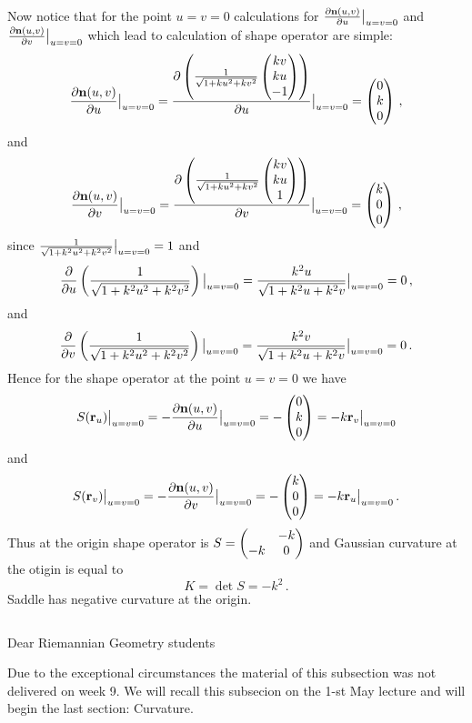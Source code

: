 \documentclass[12pt]{article}
\theoremstyle{theorem}
\numberwithin{equation}{section}
\begin{document}
{ 
Now notice that for the point $u=v=0$
calculations for 
${\partial{\bf n}(u,v)\over \partial u}\big\vert_{u=v=0}$ and
${\partial{\bf n}(u,v)\over \partial v}\big\vert_{u=v=0}$ which lead to
calculation of shape operator are
simple:
      $$
{\partial{\bf n}(u,v)\over \partial u}\big\vert_{u=v=0}=
{\partial  \left(  
   {1\over \sqrt {1+ku^2+kv^2}}
       \begin{pmatrix}
     kv\cr ku\cr -1\cr
    \end{pmatrix}
         \right)
     \over \partial u}\big\vert_{u=v=0}= 
      \begin{pmatrix}
      0\cr k\cr 0\cr
       \end{pmatrix}\,,
         $$
and   $$
{\partial{\bf n}(u,v)\over \partial v}\big\vert_{u=v=0}=
{\partial  \left(  
   {1\over \sqrt {1+ku^2+kv^2}}
       \begin{pmatrix}
     kv\cr ku\cr 1\cr
    \end{pmatrix}
         \right)
     \over \partial v}\big\vert_{u=v=0}= 
      \begin{pmatrix}
       k\cr 0\cr 0\cr
       \end{pmatrix}\,,
         $$
since
     ${1\over \sqrt {1+k^2u^2+k^2v^2}}\big\vert_{u=v=0}=1$
and
          $$
{\partial\over \partial u}\left(
{1\over \sqrt {1+k^2u^2+k^2v^2}}
  \right)\big\vert_{u=v=0}=
{k^2u\over \sqrt {1+k^2u+k^2v}}\big\vert_{u=v=0}
=0\,,
     $$
and        $$
{\partial\over \partial v}\left(
{1\over \sqrt {1+k^2u^2+k^2v^2}}
  \right)\big\vert_{u=v=0}=
{k^2v\over \sqrt {1+k^2u+k^2v}}\big\vert_{u=v=0}
=0\,.
     $$
Hence for the shape operator at the point $u=v=0$ we have
    $$
S({\bf r}_u)\big\vert_{u=v=0}=
-{\partial{\bf n}(u,v)\over \partial u}\big\vert_{u=v=0}=
 -\begin{pmatrix} 0\cr k\cr 0\cr \end{pmatrix}=
-k{\bf r}_v\big\vert_{u=v=0}
  $$
and  $$
S({\bf r}_v)\big\vert_{u=v=0}=
-{\partial{\bf n}(u,v)\over \partial v}\big\vert_{u=v=0}=
 -\begin{pmatrix} k\cr 0\cr 0\cr \end{pmatrix}=
-k{\bf r}_u\big\vert_{u=v=0}\,.
  $$
Thus at the origin shape operator is
 $S=\begin{pmatrix} &-k\cr -k & 0\end{pmatrix}$
and Gaussian curvature at the otigin is equal to
     $$
K=\det S=-k^2\,.
    $$    
 Saddle has negative curvature at the origin.      


     $$ $$
{\tt 

   \centerline {Dear Riemannian Geometry students}

Due to the exceptional circumstances the material of this 
subsection  was not  delivered on week 9.
We will recall this subsecion on the 1-st May lecture and will
begin the last section: Curvature.
}

}
\end{document}

